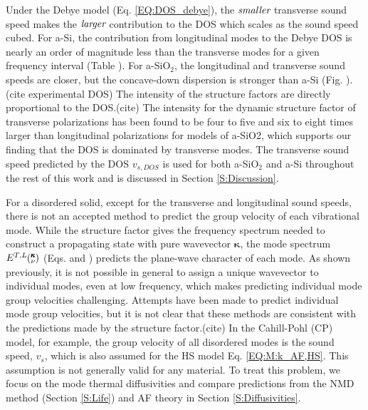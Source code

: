 \documentclass[aps,prb,onecolumn,preprint,superscriptaddress,footinbib,amsmath,amssymb,floatfix]{revtex4}
\newcommand{\kv}{\mspace{-4.0mu}\left(\mspace{-8.0mu}
\begin{smallmatrix}&\pmb{\kappa} \\&\nu\end{smallmatrix}
\mspace{-3.0mu}\right)}
\begin{document}
Under the Debye model (Eq. \eqref{EQ:DOS_debye}), 
the $\emph{smaller}$ transverse sound speed 
makes the $\emph{larger}$ contribution to the DOS which scales 
as the sound speed cubed. For a-Si, 
the contribution from longitudinal modes to the Debye DOS is nearly 
an order of magnitude less than the transverse modes for a given 
frequency interval (Table ). For a-SiO$_2$, the longitudinal and 
transverse sound speeds are closer, but the concave-down dispersion 
is stronger than a-Si (Fig. ).(cite experimental DOS) 
The intensity of the structure factors  
are directly proportional to the DOS.(cite)
The intensity for the dynamic structure factor of transverse 
polarizations has been found to be four to five\cite{taraskin_phonons_1997} 
and six to eight\cite{horbach_high_2001} times larger than longitudinal 
polarizations for models 
of a-SiO2, which supports our finding that the DOS is dominated 
by transverse modes. 
The transverse sound speed predicted by the DOS $v_{s,DOS}$ is used for both 
a-SiO$_2$ and a-Si throughout the rest of this work and is discussed 
in Section \ref{S:Discussion}.

For a disordered solid, 
except for the transverse and longitudinal sound speeds, there is not an 
accepted method to predict the group velocity of each  
vibrational mode. 
While the structure factor gives the frequency spectrum needed to 
construct a propagating state with pure wavevector $\pmb{\kappa}$, 
the mode spectrum $E^{T,L}\kv$ (Eqs. and ) predicts the plane-wave 
character of each mode. As shown previously, it is not possible 
in general 
to assign a unique wavevector to individual modes, even at low frequency,
\cite{biswas_vibrational_1988,feldman_thermal_1993,silbert_normal_2009} 
which makes predicting individual mode group velocities challenging. 
Attempts have been made to predict individual mode group velocities,
\cite{cahill_lattice_1988,duda_reducing_2011,donadio_atomistic_2009,
he_heat_2011,he_thermal_2011,hori_phonon_2013} 
but 
it is not clear that these methods are consistent with the predictions 
made by the structure factor.(cite) 
In the Cahill-Pohl (CP) model, for example, the group velocity of 
all disordered modes is the sound speed, $v_s$, which is also assumed  
for the HS model Eq. \eqref{EQ:M:k_AF,HS}.
\cite{cahill_lattice_1988} This assumption is not generally valid  
for any material.\cite{feldman_numerical_1999,duda_reducing_2011,
donadio_atomistic_2009,he_heat_2011,he_thermal_2011,larkin_predicting_2013}
To treat this problem, we focus on the mode thermal diffusivities 
and compare predictions from the 
NMD method (Section \ref{S:Life}) and AF theory in 
Section \ref{S:Diffusivities}.
\end{document}
